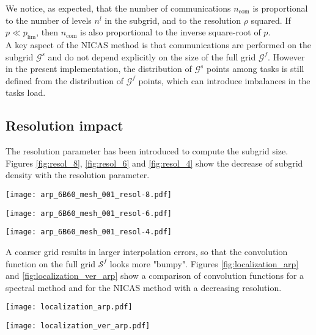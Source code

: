 \documentclass[12pt]{scrartcl}
\begin{document}
We notice, as expected, that the number of communications $n_\mathrm{com}$ is proportional to the number of levels $n^l$ in the subgrid, and to the resolution $\rho$ squared. If $p \ll p_\mathrm{lim}$, then $n_\mathrm{com}$ is also proportional to the inverse square-root of $p$.\\
$  $\\
A key aspect of the NICAS method is that communications are performed on the subgrid $\mathcal{G}^s$ and do not depend explicitly on the size of the full grid $\mathcal{G}^f$. However in the present implementation, the distribution of $\mathcal{G}^s$ points among tasks is still defined from the distribution of $\mathcal{G}^f$ points, which can introduce imbalances in the tasks load.

\subsection{Resolution impact}
The resolution parameter has been introduced to compute the subgrid size. Figures \ref{fig:resol_8}, \ref{fig:resol_6} and \ref{fig:resol_4} show the decrease of subgrid density with the resolution parameter. 

\begin{center}
\texttt{[image: arp\_6B60\_mesh\_001\_resol-8.pdf]}
\end{center}
\begin{center}
\texttt{[image: arp\_6B60\_mesh\_001\_resol-6.pdf]}
\end{center}
\begin{center}
\texttt{[image: arp\_6B60\_mesh\_001\_resol-4.pdf]}
\end{center}

A coarser grid results in larger interpolation errors, so that the convolution function on the full grid $\mathcal{S}^f$ looks more "bumpy". Figures \ref{fig:localization_arp} and \ref{fig:localization_ver_arp} show a comparison of convolution functions for a spectral method and for the NICAS method with a decreasing resolution.

\begin{center}
\texttt{[image: localization\_arp.pdf]}
\end{center}
\begin{center}
\texttt{[image: localization\_ver\_arp.pdf]}
\end{center}



\end{document}
